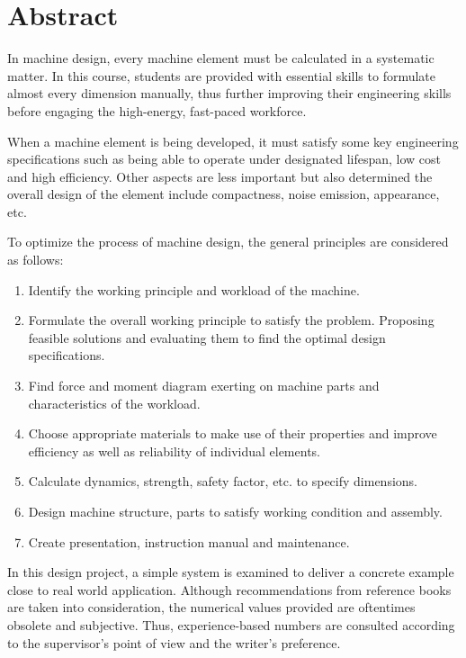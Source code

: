 \chapter*{Abstract}
In machine design, every machine element must be calculated in a systematic matter. In this course, students are provided with essential skills to formulate almost every dimension manually, thus further improving their engineering skills before engaging the high-energy, fast-paced workforce.

When a machine element is being developed, it must satisfy some key engineering specifications such as being able to operate under designated lifespan, low cost and high efficiency. Other aspects are less important but also determined the overall design of the element include compactness, noise emission, appearance, etc.

To optimize the process of machine design, the general principles are considered as follows:

\begin{enumerate}
	\item Identify the working principle and workload of the machine.
	\item Formulate the overall working principle to satisfy the problem. Proposing feasible solutions and evaluating them to find the optimal design specifications.
	\item Find force and moment diagram exerting on machine parts and characteristics of the workload.
	\item Choose appropriate materials to make use of their properties and improve efficiency as well as reliability of individual elements.
	\item Calculate dynamics, strength, safety factor, etc. to specify dimensions.
	\item Design machine structure, parts to satisfy working condition and assembly.
	\item Create presentation, instruction manual and maintenance.
\end{enumerate}

In this design project, a simple system is examined to deliver a concrete example close to real world application. Although recommendations from reference books are taken into consideration, the numerical values provided are oftentimes obsolete and subjective. Thus, experience-based numbers are consulted according to the supervisor's point of view and the writer's preference.